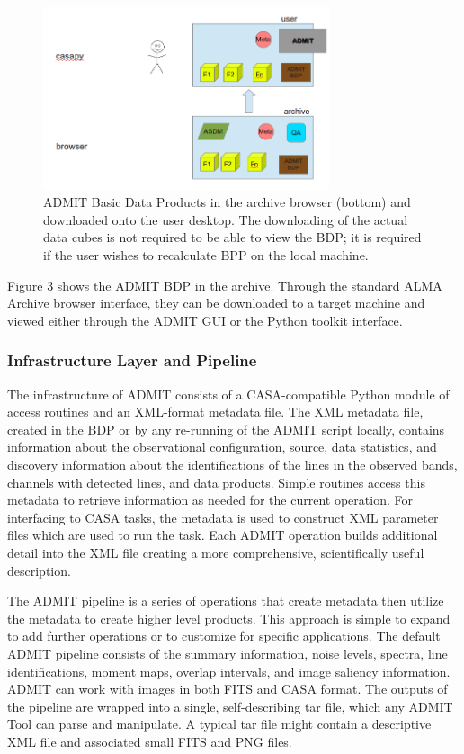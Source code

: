 \begin{figure}[t]
\centering
\includegraphics[width=0.75\textwidth]{admit-flow2a.png}
\hspace{0.03in}
\caption{\small \setlength{\baselineskip}{0.85\baselineskip}
ADMIT Basic Data Products in the archive browser (bottom) and downloaded
onto the user desktop. The downloading of the actual data cubes is not 
required to be able to view the BDP; it is required if the user wishes
to recalculate BPP on the local machine.
  }
\label{fig:Flow2}
\end{figure}

Figure 3 shows the ADMIT BDP in the archive. Through the standard ALMA Archive browser 
interface, they can be downloaded to a target machine and viewed either through the 
ADMIT GUI or the Python toolkit interface.

\subsubsection{Infrastructure Layer and Pipeline}

The infrastructure of ADMIT consists of a CASA-compatible Python module of access 
routines and an XML-format metadata file. The XML metadata file, created in the BDP 
or by any re-running of the ADMIT script locally, contains information about the 
observational configuration, source, data statistics, and discovery information about 
the identifications of the lines in the observed bands, channels with detected lines, 
and data products. Simple routines access this metadata to retrieve information as 
needed for the current operation. For interfacing to CASA tasks, the metadata is 
used to construct XML parameter files which are used to run the task. Each ADMIT 
operation builds additional detail into the XML file creating a more 
comprehensive, scientifically useful description.

The ADMIT pipeline is a series of operations that create metadata then 
utilize the metadata to create higher level products.  This approach is simple to 
expand to add further operations or to customize for specific applications.  
The default ADMIT pipeline consists of the summary information, noise levels, 
spectra, line identifications, moment maps, overlap intervals, and image 
saliency information.  ADMIT can work with images in both FITS and CASA format. 
The outputs of the pipeline are wrapped into a single, self-describing tar file, 
which any ADMIT Tool can parse and manipulate. A typical tar file might 
contain a descriptive XML file and associated small FITS and PNG files.


